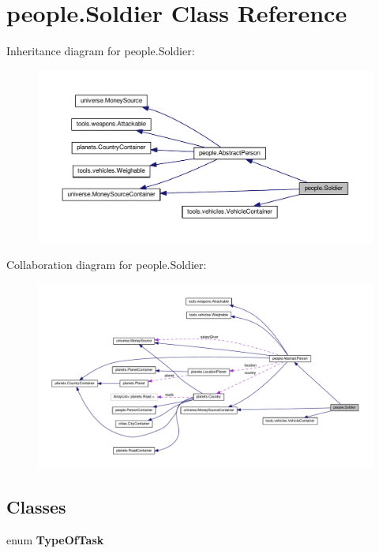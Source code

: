 \hypertarget{classpeople_1_1_soldier}{}\section{people.\+Soldier Class Reference}
\label{classpeople_1_1_soldier}


Inheritance diagram for people.\+Soldier\+:
\nopagebreak
\begin{figure}[H]
\begin{center}
\leavevmode
\includegraphics[width=350pt]{classpeople_1_1_soldier__inherit__graph}
\end{center}
\end{figure}


Collaboration diagram for people.\+Soldier\+:
\nopagebreak
\begin{figure}[H]
\begin{center}
\leavevmode
\includegraphics[width=350pt]{classpeople_1_1_soldier__coll__graph}
\end{center}
\end{figure}
\subsection*{Classes}
\begin{DoxyCompactItemize}
\item 
enum {\bfseries Type\+Of\+Task}
\end{DoxyCompactItemize}
